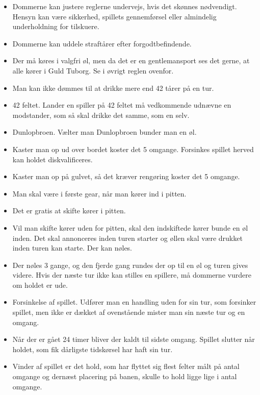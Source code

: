 \documentclass[12pt]{article}
\begin{document}
\begin{itemize}

	\item Dommerne kan justere reglerne undervejs, hvis det skønnes nødvendigt. Hensyn kan være sikkerhed, spillets gennemførsel eller almindelig underholdning for tilskuere.

	\item Dommerne kan uddele straftårer efter forgodtbefindende.

	\item Der må køres i valgfri øl, men da det er en gentlemansport ses det gerne, at alle kører i Guld Tuborg. Se i øvrigt reglen ovenfor.

	\item Man kan ikke dømmes til at drikke mere end 42 tårer på en tur.

	\item 42 feltet. Lander en spiller på 42 feltet må vedkommende udnævne en modstander, som så skal drikke det samme, som en selv.

	\item Dunlopbroen. Vælter man Dunlopbroen bunder man en øl.

	\item Kaster man op ud over bordet koster det 5 omgange. Forsinkes spillet herved kan holdet diskvalificeres.

	\item Kaster man op på gulvet, så det kræver rengøring koster det 5 omgange.

	\item Man skal være i første gear, når man kører ind i pitten.

	\item Det er gratis at skifte kører i pitten.

	\item Vil man skifte kører uden for pitten, skal den indskiftede kører bunde en øl inden. Det skal annonceres inden turen starter og øllen skal være drukket inden turen kan starte. Der kan nøles.

	\item Der nøles 3 gange, og den fjerde gang rundes der op til en øl og turen gives videre. Hvis der næste tur ikke kan stilles en spillere, må dommerne vurdere om holdet er ude.

	\item Forsinkelse af spillet. Udfører man en handling uden for sin tur, som forsinker spillet, men ikke er dækket af ovenstående mister man sin næste tur og en omgang.

	\item Når der er gået 24 timer bliver der kaldt til sidste omgang. Spillet slutter når holdet, som fik dårligste tidskørsel har haft sin tur.

	\item Vinder af spillet er det hold, som har flyttet sig flest felter målt på antal omgange og dernæst placering på banen, skulle to hold ligge lige i antal omgange.

\end{itemize}
\end{document}
